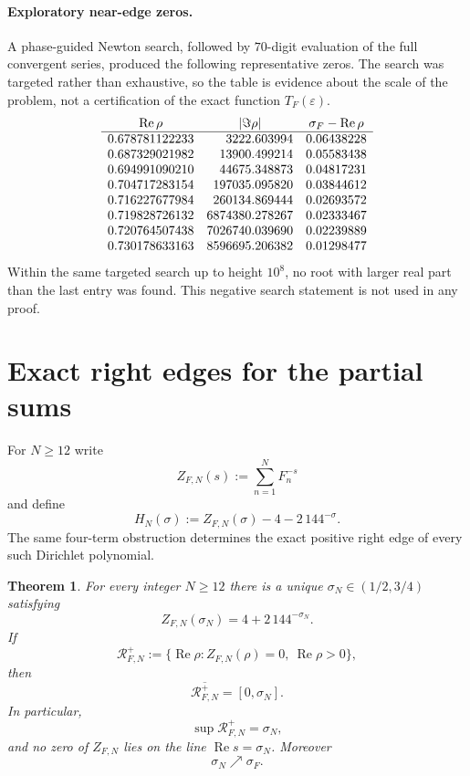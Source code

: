 \documentclass[11pt]{article}
\newtheorem{theorem}{Theorem}[section]
\theoremstyle{remark}
\newcommand{\ZFN}{Z_{F,N}}
\newcommand{\Ree}{\operatorname{Re}}
\begin{document}
\paragraph{Exploratory near-edge zeros.}
A phase-guided Newton search, followed by $70$-digit evaluation of the full convergent series, produced the following representative zeros.  The search was targeted rather than exhaustive, so the table is evidence about the scale of the problem, not a certification of the exact function $T_F(\varepsilon)$.
\[
\begin{array}{r@{.}l r@{.}l c}
\multicolumn{2}{c}{\Ree\rho}&\multicolumn{2}{c}{|\Im\rho|}&\sigma_F-\Ree\rho\\
\hline
0&678781122233&3222&603994&0.06438228\\
0&687329021982&13900&499214&0.05583438\\
0&694991090210&44675&348873&0.04817231\\
0&704717283154&197035&095820&0.03844612\\
0&716227677984&260134&869444&0.02693572\\
0&719828726132&6874380&278267&0.02333467\\
0&720764507438&7026740&039690&0.02239889\\
0&730178633163&8596695&206382&0.01298477
\end{array}
\]
Within the same targeted search up to height $10^8$, no root with larger real part than the last entry was found.  This negative search statement is not used in any proof.

\section{Exact right edges for the partial sums}

For $N\ge12$ write
\[
\ZFN(s):=\sum_{n=1}^{N}F_n^{-s}
\]
and define
\begin{equation}\label{eq:HN}
H_N(\sigma):=\ZFN(\sigma)-4-2\,144^{-\sigma}.
\end{equation}
The same four-term obstruction determines the exact positive right edge of every such Dirichlet polynomial.

\begin{theorem}\label{thm:partial}
For every integer $N\ge12$ there is a unique $\sigma_N\in(1/2,3/4)$ satisfying
\begin{equation}\label{eq:sigmaN}
\ZFN(\sigma_N)=4+2\,144^{-\sigma_N}.
\end{equation}
If
\[
\mathcal R_{F,N}^{+}
:=\{\Ree\rho:\ZFN(\rho)=0,\ \Ree\rho>0\},
\]
then
\[
\overline{\mathcal R_{F,N}^{+}}=[0,\sigma_N].
\]
In particular,
\[
\sup\mathcal R_{F,N}^{+}=\sigma_N,
\]
and no zero of $\ZFN$ lies on the line $\Ree s=\sigma_N$.  Moreover
\[
\sigma_N\nearrow\sigma_F.
\]
\end{theorem}
\end{document}
